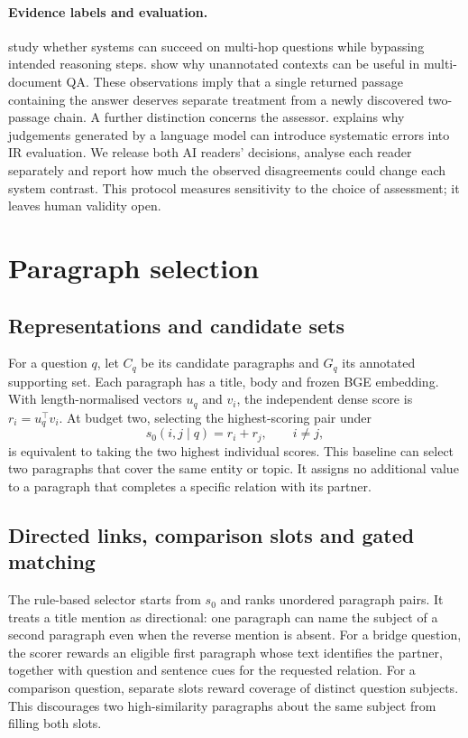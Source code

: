 \documentclass[twoside,a4paper,11pt]{article}
\begin{document}
\paragraph{Evidence labels and evaluation.}
\citet{dire} study whether systems can succeed on multi-hop questions while bypassing intended reasoning steps. \citet{ni} show why unannotated contexts can be useful in multi-document QA. These observations imply that a single returned passage containing the answer deserves separate treatment from a newly discovered two-passage chain. A further distinction concerns the assessor. \citet{soboroff} explains why judgements generated by a language model can introduce systematic errors into IR evaluation. We release both AI readers' decisions, analyse each reader separately and report how much the observed disagreements could change each system contrast. This protocol measures sensitivity to the choice of assessment; it leaves human validity open.

\section{Paragraph selection}
\subsection{Representations and candidate sets}
For a question $q$, let $C_q$ be its candidate paragraphs and $G_q$ its annotated supporting set. Each paragraph has a title, body and frozen BGE embedding. With length-normalised vectors $u_q$ and $v_i$, the independent dense score is $r_i=u_q^\top v_i$. At budget two, selecting the highest-scoring pair under
\[
 s_0(i,j\mid q)=r_i+r_j,\qquad i\ne j,
\]
is equivalent to taking the two highest individual scores. This baseline can select two paragraphs that cover the same entity or topic. It assigns no additional value to a paragraph that completes a specific relation with its partner.

\subsection{Directed links, comparison slots and gated matching}
The rule-based selector starts from $s_0$ and ranks unordered paragraph pairs. It treats a title mention as directional: one paragraph can name the subject of a second paragraph even when the reverse mention is absent. For a bridge question, the scorer rewards an eligible first paragraph whose text identifies the partner, together with question and sentence cues for the requested relation. For a comparison question, separate slots reward coverage of distinct question subjects. This discourages two high-similarity paragraphs about the same subject from filling both slots.
\end{document}
